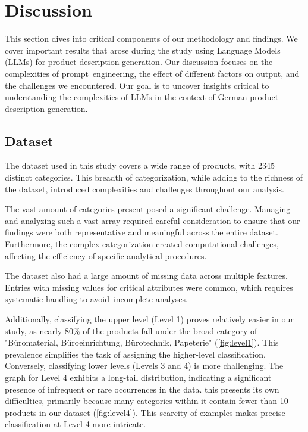 \chapter{Discussion}\label{chap:discussion}

This section dives into critical components of our methodology and findings. We cover important results that arose during the study using Language Models (LLMs) for product description generation. Our discussion focuses on the complexities of prompt engineering, the effect of different factors on output, and the challenges we encountered. Our goal is to uncover insights critical to understanding the complexities of LLMs in the context of German product description generation.

\section{Dataset}

The dataset used in this study covers a wide range of products, with 2345 distinct categories. This breadth of categorization, while adding to the richness of the dataset, introduced complexities and challenges throughout our analysis.

The vast amount of categories present posed a significant challenge. Managing and analyzing such a vast array required careful consideration to ensure that our findings were both representative and meaningful across the entire dataset. Furthermore, the complex categorization created computational challenges, affecting the efficiency of specific analytical procedures.

The dataset also had a large amount of missing data across multiple features. Entries with missing values for critical attributes were common, which requires systematic handling to avoid incomplete analyses. 


Additionally, classifying the upper level (Level 1) proves relatively easier in our study, as nearly 80\% of the products fall under the broad category of "Büromaterial, Büroeinrichtung, Bürotechnik, Papeterie" (\autoref{fig:level1}). This prevalence simplifies the task of assigning the higher-level classification. Conversely, classifying lower levels (Levels 3 and 4) is more challenging. The graph for Level 4 exhibits a long-tail distribution, indicating a significant presence of infrequent or rare occurrences in the data. this presents its own difficulties, primarily because many categories within it contain fewer than 10 products in our dataset (\autoref{fig:level4}). This scarcity of examples makes precise classification at Level 4 more intricate.

